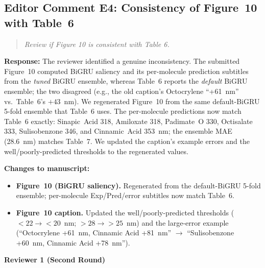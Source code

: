 \documentclass[11pt]{article}
\newenvironment{reviewer}{%
  \begin{quote}\itshape\color{black!70}}{%
  \end{quote}}
\newcommand{\response}[1]{\noindent\textbf{Response:} #1\par\medskip}
\newenvironment{changes}{%
  \noindent\textbf{Changes to manuscript:}
  \begin{itemize}[leftmargin=2em,itemsep=2pt]}{%
  \end{itemize}\medskip}
\begin{document}
\subsection*{Editor Comment E4: Consistency of Figure~10 with Table~6}
\begin{reviewer}
Review if Figure 10 is consistent with Table 6.
\end{reviewer}
\response{The reviewer identified a genuine inconsistency. The submitted Figure~10 computed BiGRU saliency and its per-molecule prediction subtitles from the \emph{tuned} BiGRU ensemble, whereas Table~6 reports the \emph{default} BiGRU ensemble; the two disagreed (e.g., the old caption's Octocrylene ``+61~nm'' vs.\ Table~6's $+43$~nm). We regenerated Figure~10 from the same default-BiGRU 5-fold ensemble that Table~6 uses. The per-molecule predictions now match Table~6 exactly: Sinapic~Acid 318, Amiloxate 318, Padimate~O 330, Octisalate 333, Sulisobenzone 346, and Cinnamic~Acid 353~nm; the ensemble MAE (28.6~nm) matches Table~7. We updated the caption's example errors and the well/poorly-predicted thresholds to the regenerated values.}
\begin{changes}
  \item \textbf{Figure~10 (BiGRU saliency).} Regenerated from the default-BiGRU 5-fold ensemble; per-molecule Exp/Pred/error subtitles now match Table~6.
  \item \textbf{Figure~10 caption.} Updated the well/poorly-predicted thresholds ($<22 \rightarrow <20$~nm; $>28 \rightarrow >25$~nm) and the large-error example (``Octocrylene +61~nm, Cinnamic Acid +81~nm'' $\rightarrow$ ``Sulisobenzone +60~nm, Cinnamic Acid +78~nm'').
\end{changes}

\bigskip
\noindent\textbf{\large Reviewer 1 (Second Round)}
\medskip
\end{document}
